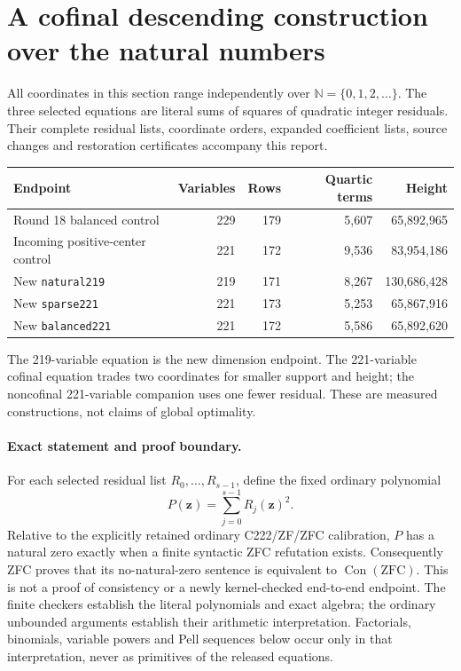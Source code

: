 \section{A cofinal descending construction over the natural numbers}
\label{sec:round19-natural}

All coordinates in this section range independently over
\(\mathbb N=\{0,1,2,\ldots\}\).  The three selected equations are literal
sums of squares of quadratic integer residuals.  Their complete residual
lists, coordinate orders, expanded coefficient lists, source changes and
restoration certificates accompany this report.
\begin{center}
\begin{tabular}{lrrrr}
\hline
Endpoint & Variables & Rows & Quartic terms & Height\\
\hline
Round 18 balanced control &229&179&5,607&65,892,965\\
Incoming positive-center control &221&172&9,536&83,954,186\\
New \texttt{natural219} &219&171&8,267&130,686,428\\
New \texttt{sparse221} &221&173&5,253&65,867,916\\
New \texttt{balanced221} &221&172&5,586&65,892,620\\
\hline
\end{tabular}
\end{center}
The 219-variable equation is the new dimension endpoint.  The 221-variable
cofinal equation trades two coordinates for smaller support and height;
the noncofinal 221-variable companion uses one fewer residual.  These are
measured constructions, not claims of global optimality.

\paragraph{Exact statement and proof boundary.}
For each selected residual list \(R_0,\ldots,R_{s-1}\), define the fixed
ordinary polynomial
\[
 P(\mathbf z)=\sum_{j=0}^{s-1}R_j(\mathbf z)^2.
\]
Relative to the explicitly retained ordinary C222/ZF/ZFC calibration,
\(P\) has a natural zero exactly when a finite syntactic ZFC refutation
exists.  Consequently ZFC proves that its no-natural-zero sentence is
equivalent to \(\operatorname{Con}(\mathrm{ZFC})\).  This is not a proof
of consistency or a newly kernel-checked end-to-end endpoint.  The finite
checkers establish the literal polynomials and exact algebra; the ordinary
unbounded arguments establish their arithmetic interpretation.  Factorials,
binomials, variable powers and Pell sequences below occur only in that
interpretation, never as primitives of the released equations.

